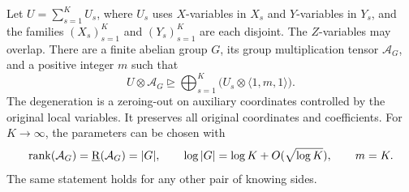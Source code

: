 \begin{lemma}
\label{lem:group}
\label{lem:separator}
Let \(U=\sum_{s=1}^{K}U_s\), where \(U_s\) uses \(X\)-variables in
\(X_s\) and \(Y\)-variables in \(Y_s\), and the families
\((X_s)_{s=1}^K\) and \((Y_s)_{s=1}^K\) are each disjoint.  The
\(Z\)-variables may overlap.  There are a finite abelian group \(G\), its
group multiplication tensor \(\mathcal A_G\), and a positive integer
\(m\) such that
\begin{equation}
 U\otimes\mathcal A_G\unrhd
 \bigoplus_{s=1}^{K}\bigl(U_s\otimes\langle1,m,1\rangle\bigr).
 \label{alg:group-identity}
\end{equation}
The degeneration is a zeroing-out on auxiliary coordinates controlled by
the original local variables.  It preserves all original coordinates and
coefficients.  For \(K\to\infty\), the parameters can be chosen with
\begin{equation}
 \operatorname{rank}(\mathcal A_G)=\operatorname{\underline R}(\mathcal A_G)=|G|,
 \qquad
 \log|G|=\log K+O(\sqrt{\log K}),
 \qquad
 m=K.
 \label{alg:group-rates}
\end{equation}
The same statement holds for any other pair of knowing sides.
\end{lemma}
